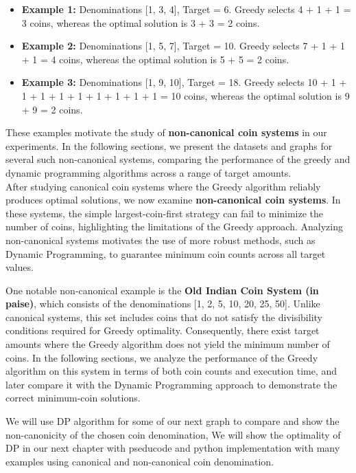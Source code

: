 \documentclass[12pt,a4paper]{report}
\begin{document}
\begin{itemize}
    \item \textbf{Example 1:} Denominations [1, 3, 4], Target = 6.  
    Greedy selects 4 + 1 + 1 = 3 coins, whereas the optimal solution is 3 + 3 = 2 coins.

    \item \textbf{Example 2:} Denominations [1, 5, 7], Target = 10.  
    Greedy selects 7 + 1 + 1 + 1 = 4 coins, whereas the optimal solution is 5 + 5 = 2 coins.

    \item \textbf{Example 3:} Denominations [1, 9, 10], Target = 18.  
    Greedy selects 10 + 1 + 1 + 1 + 1 + 1 + 1 + 1 + 1 + 1 = 10 coins, whereas the optimal solution is 9 + 9 = 2 coins.
\end{itemize}

\noindent
These examples motivate the study of \textbf{non-canonical coin systems} in our experiments. In the following sections, we present the datasets and graphs for several such non-canonical systems, comparing the performance of the greedy and dynamic programming algorithms across a range of target amounts.\\

\noindent
After studying canonical coin systems where the Greedy algorithm reliably produces optimal solutions, we now examine \textbf{non-canonical coin systems}. In these systems, the simple largest-coin-first strategy can fail to minimize the number of coins, highlighting the limitations of the Greedy approach. Analyzing non-canonical systems motivates the use of more robust methods, such as Dynamic Programming, to guarantee minimum coin counts across all target values.

\noindent
One notable non-canonical example is the \textbf{Old Indian Coin System (in paise)}, which consists of the denominations [1, 2, 5, 10, 20, 25, 50]. Unlike canonical systems, this set includes coins that do not satisfy the divisibility conditions required for Greedy optimality. Consequently, there exist target amounts where the Greedy algorithm does not yield the minimum number of coins. In the following sections, we analyze the performance of the Greedy algorithm on this system in terms of both coin counts and execution time, and later compare it with the Dynamic Programming approach to demonstrate the correct minimum-coin solutions.

\begin{tcolorbox}[colback=gray!5!white, colframe=black, title=Note on using DP without introducing it]
We will use DP algorithm for some of our next graph to compare and show the non-canonicity of the chosen coin denomination, We will show the optimality of DP in our next chapter with pseducode and python implementation with many examples using canonical and non-canonical coin denomination.
\end{tcolorbox}
\end{document}
